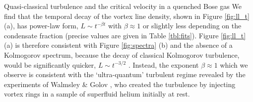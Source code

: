 \begin{chapter}{\label{cha:nonequib}Quasi-classical turbulence and the critical velocity in a quenched Bose gas}
We find that the temporal decay of the vortex line density, 
shown in Figure \ref{fig:ll_t} (a),
has power-law form, $L \sim t^{-\beta t}$ with $\beta \approx 1$ or slightly
less depending on the condensate fraction (precise values are given in Table \ref{tbl:fits}).
Figure \ref{fig:ll_t} (a) is therefore consistent with  Figure \ref{fig:spectra} (b)
and the absence of a Kolmogorov spectrum, 
because the decay of classical Kolmogorov turbulence, 
would be significantly quicker, $L \sim t^{-3/2}$ \cite{PhysRevLett.71.2583,PhysRevLett.82.4831}.
Instead, the exponent $\beta \approx 1$ which we observe is consistent with the 
`ultra-quantum' turbulent regime revealed by the experiments of
Walmsley \& Golov \cite{WalmsleyGolov2008}, who created the turbulence by
injecting vortex rings in a sample of superfluid helium initially at rest.



\end{chapter}

